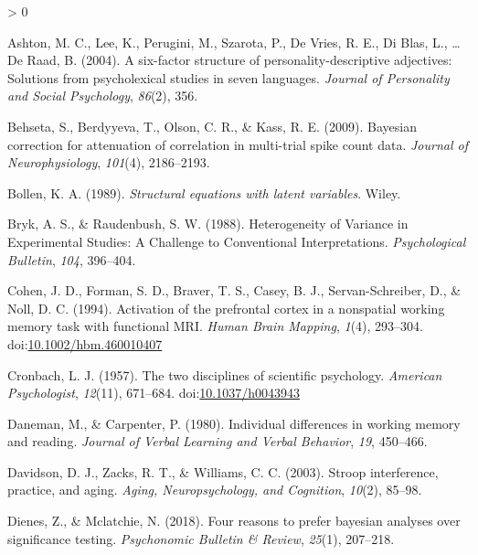 \documentclass[
  english,
  ,man]{apa6}
\newlength{\cslhangindent}
\newenvironment{CSLReferences}[2] %
 {%
  \setlength{\parindent}{0pt}
  \ifodd #1 \everypar{\setlength{\hangindent}{\cslhangindent}}\ignorespaces\fi
  \ifnum #2 > 0
  \setlength{\parskip}{#2\baselineskip}
  \fi
 }%
 {}
\begin{document}
\hypertarget{refs}{}
\begin{CSLReferences}{1}{0}
\leavevmode\hypertarget{ref-Ashton:etal:2004}{}%
Ashton, M. C., Lee, K., Perugini, M., Szarota, P., De Vries, R. E., Di Blas, L., \ldots{} De Raad, B. (2004). A six-factor structure of personality-descriptive adjectives: Solutions from psycholexical studies in seven languages. \emph{Journal of Personality and Social Psychology}, \emph{86}(2), 356.

\leavevmode\hypertarget{ref-Behseta:etal:2009}{}%
Behseta, S., Berdyyeva, T., Olson, C. R., \& Kass, R. E. (2009). Bayesian correction for attenuation of correlation in multi-trial spike count data. \emph{Journal of Neurophysiology}, \emph{101}(4), 2186--2193.

\leavevmode\hypertarget{ref-Bollen:1989}{}%
Bollen, K. A. (1989). \emph{Structural equations with latent variables}. Wiley.

\leavevmode\hypertarget{ref-Bryk.Raudenbush.1988}{}%
Bryk, A. S., \& Raudenbush, S. W. (1988). Heterogeneity of {Variance} in {Experimental Studies}: {A Challenge} to {Conventional Interpretations}. \emph{Psychological Bulletin}, \emph{104}, 396--404.

\leavevmode\hypertarget{ref-Cohen.etal.1994}{}%
Cohen, J. D., Forman, S. D., Braver, T. S., Casey, B. J., Servan-Schreiber, D., \& Noll, D. C. (1994). Activation of the prefrontal cortex in a nonspatial working memory task with functional {MRI}. \emph{Human Brain Mapping}, \emph{1}(4), 293--304. doi:\href{https://doi.org/10.1002/hbm.460010407}{10.1002/hbm.460010407}

\leavevmode\hypertarget{ref-Cronbach.1957}{}%
Cronbach, L. J. (1957). The two disciplines of scientific psychology. \emph{American Psychologist}, \emph{12}(11), 671--684. doi:\href{https://doi.org/10.1037/h0043943}{10.1037/h0043943}

\leavevmode\hypertarget{ref-Daneman.Carpenter.1980}{}%
Daneman, M., \& Carpenter, P. (1980). Individual differences in working memory and reading. \emph{Journal of Verbal Learning and Verbal Behavior}, \emph{19}, 450--466.

\leavevmode\hypertarget{ref-Davidson.etal.2003}{}%
Davidson, D. J., Zacks, R. T., \& Williams, C. C. (2003). Stroop interference, practice, and aging. \emph{Aging, Neuropsychology, and Cognition}, \emph{10}(2), 85--98.

\leavevmode\hypertarget{ref-Dienes:Mclatchie:2018}{}%
Dienes, Z., \& Mclatchie, N. (2018). Four reasons to prefer bayesian analyses over significance testing. \emph{Psychonomic Bulletin \& Review}, \emph{25}(1), 207--218.


\end{CSLReferences}
\end{document}
